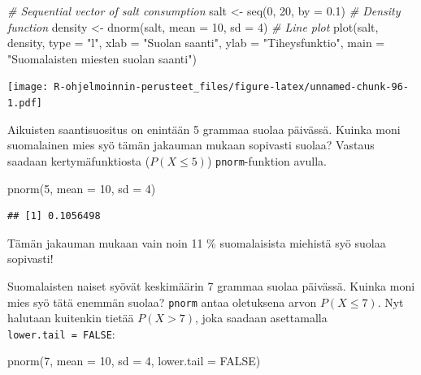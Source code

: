 \documentclass[
]{book}
\newenvironment{Shaded}{\begin{snugshade}}{\end{snugshade}}
\newcommand{\AttributeTok}[1]{\textcolor[rgb]{0.77,0.63,0.00}{#1}}
\newcommand{\CommentTok}[1]{\textcolor[rgb]{0.56,0.35,0.01}{\textit{#1}}}
\newcommand{\ConstantTok}[1]{\textcolor[rgb]{0.00,0.00,0.00}{#1}}
\newcommand{\DecValTok}[1]{\textcolor[rgb]{0.00,0.00,0.81}{#1}}
\newcommand{\FloatTok}[1]{\textcolor[rgb]{0.00,0.00,0.81}{#1}}
\newcommand{\FunctionTok}[1]{\textcolor[rgb]{0.00,0.00,0.00}{#1}}
\newcommand{\NormalTok}[1]{#1}
\newcommand{\OtherTok}[1]{\textcolor[rgb]{0.56,0.35,0.01}{#1}}
\newcommand{\StringTok}[1]{\textcolor[rgb]{0.31,0.60,0.02}{#1}}
\begin{document}
\begin{Shaded}
\begin{Highlighting}[]
\CommentTok{\# Sequential vector  of salt consumption}
\NormalTok{salt }\OtherTok{\textless{}{-}} \FunctionTok{seq}\NormalTok{(}\DecValTok{0}\NormalTok{, }\DecValTok{20}\NormalTok{, }\AttributeTok{by =} \FloatTok{0.1}\NormalTok{)}
\CommentTok{\# Density function}
\NormalTok{density }\OtherTok{\textless{}{-}} \FunctionTok{dnorm}\NormalTok{(salt, }\AttributeTok{mean =} \DecValTok{10}\NormalTok{, }\AttributeTok{sd =} \DecValTok{4}\NormalTok{)}
\CommentTok{\# Line plot}
\FunctionTok{plot}\NormalTok{(salt, density, }\AttributeTok{type =} \StringTok{"l"}\NormalTok{,}
     \AttributeTok{xlab =} \StringTok{"Suolan saanti"}\NormalTok{, }\AttributeTok{ylab =} \StringTok{"Tiheysfunktio"}\NormalTok{,}
     \AttributeTok{main =} \StringTok{"Suomalaisten miesten suolan saanti"}\NormalTok{)}
\end{Highlighting}
\end{Shaded}

\texttt{[image: R-ohjelmoinnin-perusteet\_files/figure-latex/unnamed-chunk-96-1.pdf]}

Aikuisten saantisuositus on enintään 5 grammaa suolaa päivässä. Kuinka moni suomalainen mies syö tämän jakauman mukaan sopivasti suolaa? Vastaus saadaan kertymäfunktiosta (\(P(X \leq 5)\)) \texttt{pnorm}-funktion avulla.

\begin{Shaded}
\begin{Highlighting}[]
\FunctionTok{pnorm}\NormalTok{(}\DecValTok{5}\NormalTok{, }\AttributeTok{mean =} \DecValTok{10}\NormalTok{, }\AttributeTok{sd =} \DecValTok{4}\NormalTok{)}
\end{Highlighting}
\end{Shaded}

\begin{verbatim}
## [1] 0.1056498
\end{verbatim}

Tämän jakauman mukaan vain noin 11 \% suomalaisista miehistä syö suolaa sopivasti!

Suomalaisten naiset syövät keskimäärin 7 grammaa suolaa päivässä. Kuinka moni mies syö tätä enemmän suolaa? \texttt{pnorm} antaa oletuksena arvon \(P(X \leq 7)\). Nyt halutaan kuitenkin tietää \(P(X > 7)\), joka saadaan asettamalla \texttt{lower.tail\ =\ FALSE}:

\begin{Shaded}
\begin{Highlighting}[]
\FunctionTok{pnorm}\NormalTok{(}\DecValTok{7}\NormalTok{, }\AttributeTok{mean =} \DecValTok{10}\NormalTok{, }\AttributeTok{sd =} \DecValTok{4}\NormalTok{, }\AttributeTok{lower.tail =} \ConstantTok{FALSE}\NormalTok{)}
\end{Highlighting}
\end{Shaded}
\end{document}
